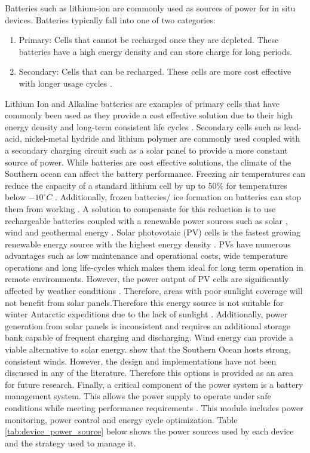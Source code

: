 Batteries such as lithium-ion are commonly used as sources of power for in situ devices. Batteries typically fall into one of two categories:
\begin{enumerate}
	\item Primary: Cells that cannot be recharged once they are depleted. These batteries have a high energy density and can store charge for long periods.\cite{besenhard2008handbook}
	\item Secondary: Cells that can be recharged. These cells are more cost effective with longer usage cycles \cite{besenhard2008handbook}.
\end{enumerate}

Lithium  Ion and Alkaline batteries are examples of primary cells that have commonly been used as they provide a cost effective solution due to their high energy density and long-term consistent life cycles \cite{zareer2018review}.  Secondary cells such as lead-acid, nickel-metal hydride and lithium polymer are commonly used coupled with a secondary charging circuit such as a solar panel \cite{manimekalai2013overview} to provide a more constant source of power. While batteries are cost effective solutions, the climate of the Southern ocean can affect the battery performance. Freezing air temperatures can reduce the capacity of a standard lithium cell by up to 50\% for temperatures below $-10^\circ C$ \cite{doble2017robust,ZHANG2003137}. Additionally, frozen batteries/ ice formation on batteries can stop them from working \cite{doble2017robust,manimekalai2013overview}. A solution to compensate for this reduction is to use rechargeable batteries coupled with a renewable power sources such as solar \cite{doble2017robust,rabault2019open}, wind and geothermal energy \cite{manimekalai2013overview}. Solar photovotaic (PV) cells is the fastest growing renewable energy source with the highest energy density \cite{jordehi2016parameter}. PVs have numerous advantages such as low maintenance and operational costs, wide temperature operations and long life-cycles \cite{jordehi2016parameter} which makes them ideal for long term operation in remote environments. However, the power output of PV cells are significantly affected by weather conditions \cite{sharma2015solar}. Therefore, areas with poor sunlight coverage will not benefit from solar panels.Therefore this energy source is not suitable for winter Antarctic expeditions due to the lack of sunlight \cite{lever2006solar}. Additionally, power generation from solar panels is inconsistent and requires an additional storage bank capable of frequent charging and discharging. Wind energy can provide a viable alternative to solar energy. \textcite{vichi2019effects} show that the Southern Ocean hosts strong, consistent winds. However, the design and implementations have not been discussed in any of the literature. Therefore this options is provided as an area for future research. Finally, a critical component of the power system is a battery management system. This allows the power supply to operate under safe conditions while meeting performance requirements \cite{vidal2019xev}. This module includes power monitoring, power control and energy cycle optimization. Table \ref{tab:device_power_source} below shows the power sources used by each device and the strategy used to manage it.
